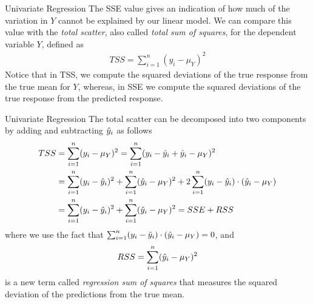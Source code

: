 %
\begin{frame}{Univariate Regression}
The SSE value gives an indication of how much of the variation in $Y$
cannot be explained by our linear model. We can compare this value with
the {\em total scatter}, also called {\em total sum of squares}, 
for the dependent variable $Y$, defined as
\begin{align*}
    TSS = \sum^{n}_{i=1} (y_i - \mu_{Y})^2
\end{align*}
Notice that in TSS, we compute the squared deviations of the true
response from the true mean for $Y$, whereas, in SSE we compute the
squared deviations of the true response from the predicted response.
%
%
\end{frame}

\begin{frame}{Univariate Regression}
The total scatter can be decomposed into two components by adding and
subtracting $\hat{y}_i$ as follows
\begin{align*}
    TSS & = \sum^{n}_{i=1} (y_i - \mu_{Y})^2
    = \sum^{n}_{i=1} (y_i - \hat{y}_i + \hat{y}_i - \mu_{Y})^2 \\
& = \sum^{n}_{i=1} (y_i - \hat{y}_i)^2 + \sum_{i=1}^n (\hat{y}_i - \mu_{Y})^2 + 
2 \sum^{n}_{i=1} (y_i - \hat{y}_i) \cdot (\hat{y}_i - \mu_Y)\\
& = \sum^{n}_{i=1} (y_i - \hat{y}_i)^2 + \sum_{i=1}^n (\hat{y}_i - \mu_{Y})^2
= SSE + RSS
\end{align*}
where we use the fact that $\sum^{n}_{i=1} (y_i - \hat{y}_i) \cdot (\hat{y}_i -
\mu_Y) = 0$, and
\begin{align*}
RSS = \sum_{i=1}^n (\hat{y}_i - \mu_{Y})^2
\end{align*}
is a new term called
{\em regression sum of squares} that measures the squared deviation of the
predictions from the true mean.
\end{frame}

